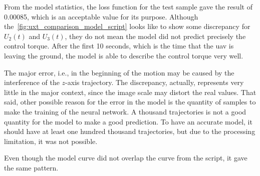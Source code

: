 From the model statistics, the loss function for the test sample gave the result of 0.00085, which is an acceptable value for its purpose.
Although the~\cref{fig:uxt_comparison_model_script} looks like to show some discrepancy for \(U_2(t)\) and \(U_3(t)\), they do not mean the model did not predict precisely the control torque. 
After the first 10 seconds, which is the time that the \gls*{uav} is leaving the ground, the model is able to describe the control torque very well.

The major error, i.e., in the beginning of the motion may be caused by the interference of the \(z\)-axis trajectory. 
The discrepancy, actually, represents very little in the major context, since the image scale may distort the real values.
That said, other possible reason for the error in the model is the quantity of samples to make the training of the neural network. 
A thousand trajectories is not a good quantity for the model to make a good prediction.
To have an accurate model, it should have at least one hundred thousand trajectories, but due to the processing limitation, it was not possible.

Even though the model curve did not overlap the curve from the script, it gave the same pattern.